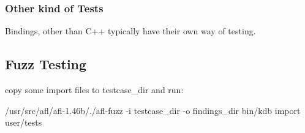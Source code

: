 \subsubsection*{Other kind of Tests}

Bindings, other than C++ typically have their own way of testing.

\subsection*{Fuzz Testing}

copy some import files to testcase\+\_\+dir and run\+:

/usr/src/afl/afl-\/1.46b/./afl-\/fuzz -\/i testcase\+\_\+dir -\/o findings\+\_\+dir bin/kdb import user/tests 